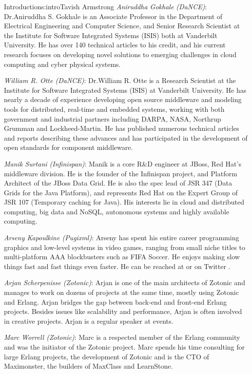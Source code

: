 \begin{aosachapter}{Introduction}{s:intro}{Tavish Armstrong}
\emph{Aniruddha Gokhale (DaNCE)}: Dr.\@ Aniruddha S. Gokhale is an Associate Professor in the Department of Electrical Engineering and Computer Science, and Senior Research Scientist at the Institute for Software Integrated Systems (ISIS) both at Vanderbilt University. He has over 140 technical articles to his credit, and his current research focuses on developing novel solutions to emerging challenges in cloud computing and cyber physical systems.

\emph{William R. Otte (DaNCE)}: Dr.\@ William R. Otte is a Research Scientist at the Institute for Software Integrated Systems (ISIS) at Vanderbilt University.  He has nearly a decade of experience developing open source middleware and modeling tools for distributed, real-time and embedded systems, working with both government and industrial partners including DARPA, NASA, Northrup Grumman and Lockheed-Martin. He has published numerous technical articles and reports describing these advances and has participated in the development of open standards for component middleware.

\emph{Manik Surtani (Infinispan)}: Manik is a core R\&D engineer at JBoss, Red Hat's middleware division. He is the founder of the Infinispan project, and Platform Architect of the JBoss Data Grid. He is also the spec lead of JSR 347 (Data Grids for the Java Platform), and represents Red Hat on the Expert Group of JSR 107 (Temporary caching for Java). His interests lie in cloud and distributed computing, big data and NoSQL, autonomous systems and highly available computing. 

\emph{Arseny Kapoulkine (Pugixml)}: Arseny has spent his entire career programming graphics and low-level systems in video games, ranging from small niche titles to multi-platform AAA blockbusters such as FIFA Soccer. He enjoys making slow things fast and fast things even faster. He can be reached at  or on Twitter .

\emph{Arjan Scherpenisse (Zotonic)}: Arjan is one of the main architects of Zotonic and manages to work on dozens of projects at the same time, mostly using Zotonic and Erlang. Arjan bridges the gap between back-end and front-end Erlang projects. Besides issues like scalability and performance, Arjan  is often involved in creative projects. Arjan is a regular speaker at events.

\emph{Marc Worrell (Zotonic)}: Marc is a respected member of the Erlang community and was the initiator of the Zotonic project. Marc spends his time consulting for large Erlang projects, the development of Zotonic and is the CTO of Maximonster, the builders of MaxClass and LearnStone.


\end{aosachapter}

